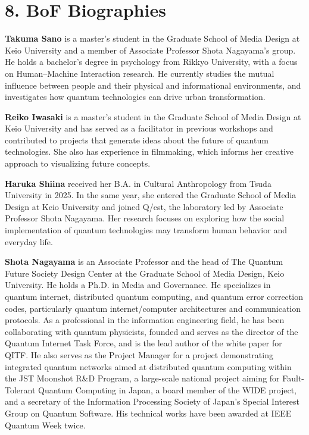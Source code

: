 \documentclass[10pt,conference]{IEEEtran}
\begin{document}
\section*{8. BoF Biographies}

\textbf{Takuma Sano} is a master's student in the Graduate School of Media Design at Keio University and a member of Associate Professor Shota Nagayama's group. He holds a bachelor's degree in psychology from Rikkyo University, with a focus on Human--Machine Interaction research. He currently studies the mutual influence between people and their physical and informational environments, and investigates how quantum technologies can drive urban transformation.

\textbf{Reiko Iwasaki} is a master's student in the Graduate School of Media Design at Keio University and has served as a facilitator in previous workshops and contributed to projects that generate ideas about the future of quantum technologies. She also has experience in filmmaking, which informs her creative approach to visualizing future concepts.

\textbf{Haruka Shiina} received her B.A. in Cultural Anthropology from Tsuda University in 2025. In the same year, she entered the Graduate School of Media Design at Keio University and joined Q/est, the laboratory led by Associate Professor Shota Nagayama. Her research focuses on exploring how the social implementation of quantum technologies may transform human behavior and everyday life.

\textbf{Shota Nagayama} is an Associate Professor and the head of The Quantum Future Society Design Center at the Graduate School of Media Design, Keio University. He holds a Ph.D. in Media and Governance. He specializes in quantum internet, distributed quantum computing, and quantum error correction codes, particularly quantum internet/computer architectures and communication protocols. As a professional in the information engineering field, he has been collaborating with quantum physicists, founded and serves as the director of the Quantum Internet Task Force, and is the lead author of the white paper for QITF. He also serves as the Project Manager for a project demonstrating integrated quantum networks aimed at distributed quantum computing within the JST Moonshot R\&D Program, a large-scale national project aiming for Fault-Tolerant Quantum Computing in Japan, a board member of the WIDE project, and a secretary of the Information Processing Society of Japan's Special Interest Group on Quantum Software. His technical works have been awarded at IEEE Quantum Week twice.
\end{document}
